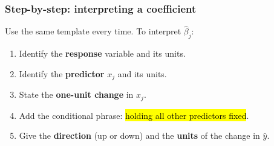 \documentclass[slidestop,compress,mathserif]{beamer}
\begin{document}
\begin{frame}
\frametitle{Step-by-step: interpreting a coefficient}

Use the same template every time. To interpret $\widehat{\beta}_j$:

\begin{enumerate}
\item Identify the \textbf{response} variable and its units.
\item Identify the \textbf{predictor} $x_j$ and its units.
\item State the \textbf{one-unit change} in $x_j$.
\item Add the conditional phrase: \hl{holding all other predictors fixed}.
\item Give the \textbf{direction} (up or down) and the \textbf{units} of the change in $\widehat{y}$.
\end{enumerate}


\end{frame}
\end{document}

